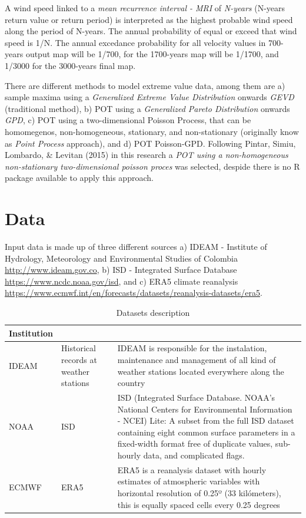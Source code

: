 \documentclass[12pt,twoside]{reedthesis}
\begin{document}
A wind speed linked to a \emph{mean recurrence interval - MRI} of \emph{N-years} (N-years return value or return period) is interpreted as the highest probable wind speed along the period of N-years. The annual probability of equal or exceed that wind speed is 1/N. The annual excedance probability for all velocity values in 700-years output map will be 1/700, for the 1700-years map will be 1/1700, and 1/3000 for the 3000-years final map.

There are different methods to model extreme value data, among them are a) sample maxima using a \emph{Generalized Extreme Value Distribution} onwards \emph{GEVD} (traditional method), b) POT using a \emph{Generalized Pareto Distribution} onwards \emph{GPD}, c) POT using a two-dimensional Poisson Process, that can be homomegenos, non-homogeneous, stationary, and non-stationary (originally know as \emph{Point Process} approach), and d) POT Poisson-GPD. Following Pintar, Simiu, Lombardo, \& Levitan (2015) in this research a \emph{POT using a non-homogeneous non-stationary two-dimensional poisson proces} was selected, despide there is no R package available to apply this approach.

\hypertarget{rmd-data}{%
\chapter{Data}\label{rmd-data}}

Input data is made up of three different sources a) IDEAM - Institute of Hydrology, Meteorology and Environmental Studies of Colombia \url{http://www.ideam.gov.co}, b) ISD - Integrated Surface Database \url{https://www.ncdc.noaa.gov/isd}, and c) ERA5 climate reanalysis \url{https://www.ecmwf.int/en/forecasts/datasets/reanalysis-datasets/era5}.

\begingroup\fontsize{10}{12}\selectfont
\begin{longtable}[t]{l>{\raggedright\arraybackslash}p{0.8in}>{\raggedright\arraybackslash}p{4in}}
\caption[Datasets]{\label{tab:tabledatasources1}Datasets description}\\
\toprule
\multicolumn{1}{l}{Institution} & \multicolumn{1}{l}{Dataset} & \multicolumn{1}{l}{Details}\\
\midrule
IDEAM & Historical records at weather stations & IDEAM is responsible for the instalation, maintenance and management of all kind of weather stations located everywhere along the country\\
NOAA & ISD & ISD (Integrated Surface Database. NOAA's National Centers for Environmental Information - NCEI) Lite: A subset from the full ISD dataset containing eight common surface parameters in a fixed-width format free of duplicate values, sub-hourly data, and complicated flags.\\
ECMWF & ERA5 & ERA5 is a reanalysis dataset with hourly estimates of atmospheric variables with horizontal resolution of 0.25º (33 kilómeters), this is equally spaced cells every 0.25 degrees\\
\bottomrule
\end{longtable}
\endgroup{}
\end{document}
